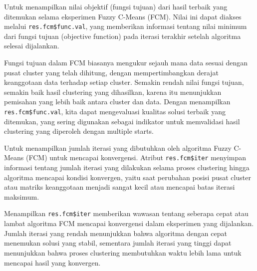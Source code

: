 \documentclass[
  oneside]{book}
\newenvironment{Shaded}{\begin{snugshade}}{\end{snugshade}}
\newcommand{\CommentTok}[1]{\textcolor[rgb]{0.56,0.35,0.01}{\textit{#1}}}
\newcommand{\NormalTok}[1]{#1}
\newcommand{\SpecialCharTok}[1]{\textcolor[rgb]{0.81,0.36,0.00}{\textbf{#1}}}
\begin{document}
Untuk menampilkan nilai objektif (fungsi tujuan) dari hasil terbaik yang ditemukan selama eksperimen Fuzzy C-Means (FCM). Nilai ini dapat diakses melalui \texttt{res.fcm\$func.val}, yang memberikan informasi tentang nilai minimum dari fungsi tujuan (objective function) pada iterasi terakhir setelah algoritma selesai dijalankan.

Fungsi tujuan dalam FCM biasanya mengukur sejauh mana data sesuai dengan pusat cluster yang telah dihitung, dengan mempertimbangkan derajat keanggotaan data terhadap setiap cluster. Semakin rendah nilai fungsi tujuan, semakin baik hasil clustering yang dihasilkan, karena itu menunjukkan pemisahan yang lebih baik antara cluster dan data. Dengan menampilkan \texttt{res.fcm\$func.val}, kita dapat mengevaluasi kualitas solusi terbaik yang ditemukan, yang sering digunakan sebagai indikator untuk memvalidasi hasil clustering yang diperoleh dengan multiple starts.

\begin{Shaded}
\end{Shaded}

Untuk menampilkan jumlah iterasi yang dibutuhkan oleh algoritma Fuzzy C-Means (FCM) untuk mencapai konvergensi. Atribut \texttt{res.fcm\$iter} menyimpan informasi tentang jumlah iterasi yang dilakukan selama proses clustering hingga algoritma mencapai kondisi konvergen, yaitu saat perubahan posisi pusat cluster atau matriks keanggotaan menjadi sangat kecil atau mencapai batas iterasi maksimum.

Menampilkan \texttt{res.fcm\$iter} memberikan wawasan tentang seberapa cepat atau lambat algoritma FCM mencapai konvergensi dalam eksperimen yang dijalankan. Jumlah iterasi yang rendah menunjukkan bahwa algoritma dengan cepat menemukan solusi yang stabil, sementara jumlah iterasi yang tinggi dapat menunjukkan bahwa proses clustering membutuhkan waktu lebih lama untuk mencapai hasil yang konvergen.

\begin{Shaded}
\end{Shaded}
\end{document}
